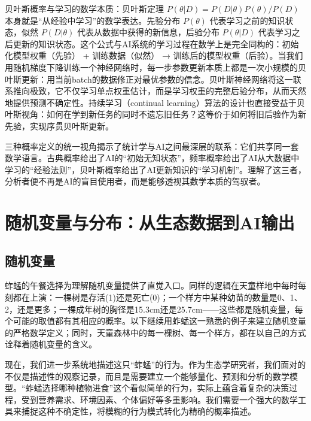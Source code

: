 \documentclass[
  twoside,12pt,fontset=none]{ctexbook}
\begin{document}
贝叶斯概率与学习的数学本质：贝叶斯定理 \(P(\theta|D) = P(D|\theta)P(\theta) / P(D)\) 本身就是``从经验中学习''的数学表达。先验分布 \(P(\theta)\) 代表学习之前的知识状态，似然 \(P(D|\theta)\) 代表从数据中获得的新信息，后验分布 \(P(\theta|D)\) 代表学习之后更新的知识状态。这个公式与AI系统的学习过程在数学上是完全同构的：初始化模型权重（先验） + 训练数据（似然） → 训练后的模型权重（后验）。当我们用随机梯度下降训练一个神经网络时，每一步参数更新本质上都是一次小规模的贝叶斯更新：用当前batch的数据修正对最优参数的信念。贝叶斯神经网络将这一联系推向极致，它不仅学习单点权重估计，而是学习权重的完整后验分布，从而天然地提供预测不确定性。持续学习（continual learning）算法的设计也直接受益于贝叶斯视角：如何在学到新任务的同时不遗忘旧任务？这等价于如何将旧后验作为新先验，实现序贯贝叶斯更新。

三种概率定义的统一视角揭示了统计学与AI之间最深层的联系：它们共享同一套数学语言。古典概率给出了AI的``初始无知状态''，频率概率给出了AI从大数据中学习的``经验法则''，贝叶斯概率给出了AI更新知识的``学习机制''。理解了这三者，分析者便不再是AI的盲目使用者，而是能够透视其数学本质的驾驭者。

\hypertarget{ux968fux673aux53d8ux91cfux4e0eux5206ux5e03ux4eceux751fux6001ux6570ux636eux5230aiux8f93ux51fa}{%
\section{随机变量与分布：从生态数据到AI输出}\label{ux968fux673aux53d8ux91cfux4e0eux5206ux5e03ux4eceux751fux6001ux6570ux636eux5230aiux8f93ux51fa}}

\hypertarget{ux968fux673aux53d8ux91cf}{%
\subsection{随机变量}\label{ux968fux673aux53d8ux91cf}}

蚱蜢的午餐选择为理解随机变量提供了直觉入口。同样的逻辑在天童样地中每时每刻都在上演：一棵树是存活(1)还是死亡(0)；一个样方中某种幼苗的数量是0、1、2，还是更多；一棵成年树的胸径是15.3cm还是25.7cm------这些都是随机变量，每个可能的取值都有其相应的概率。以下继续用蚱蜢这一熟悉的例子来建立随机变量的严格数学定义；同时，天童森林中的每一棵树、每一个样方，都在以自己的方式诠释着随机变量的含义。

现在，我们进一步系统地描述这只``蚱蜢''的行为。作为生态学研究者，我们面对的不仅是描述性的观察记录，而且是需要建立一个能够量化、预测和分析的数学模型。``蚱蜢选择哪种植物进食''这个看似简单的行为，实际上蕴含着复杂的决策过程，受到营养需求、环境因素、个体偏好等多重影响。我们需要一个强大的数学工具来捕捉这种不确定性，将模糊的行为模式转化为精确的概率描述。
\end{document}
